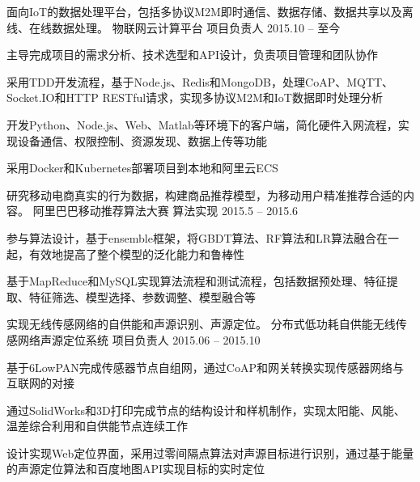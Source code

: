 





\begin{cventries}


\cventry
{面向IoT的数据处理平台，包括多协议M2M即时通信、数据存储、数据共享以及离线、在线数据处理。} %
{物联网云计算平台} %
{项目负责人} %
{2015.10 -- 至今} %
{ %
\begin{cvitems}
\item {主导完成项目的需求分析、技术选型和API设计，负责项目管理和团队协作}
\item {采用TDD开发流程，基于Node.js、Redis和MongoDB，处理CoAP、MQTT、Socket.IO和HTTP RESTful请求，实现多协议M2M和IoT数据即时处理分析}
\item {开发Python、Node.js、Web、Matlab等环境下的客户端，简化硬件入网流程，实现设备通信、权限控制、资源发现、数据上传等功能}
\item{采用Docker和Kubernetes部署项目到本地和阿里云ECS}
\end{cvitems}
}

\cventry
{研究移动电商真实的行为数据，构建商品推荐模型，为移动用户精准推荐合适的内容。} %
{阿里巴巴移动推荐算法大赛} %
{算法实现} %
{2015.5 -- 2015.6} %
{ %
\begin{cvitems}
\item {参与算法设计，基于ensemble框架，将GBDT算法、RF算法和LR算法融合在一起，有效地提高了整个模型的泛化能力和鲁棒性}
\item {基于MapReduce和MySQL实现算法流程和测试流程，包括数据预处理、特征提取、特征筛选、模型选择、参数调整、模型融合等}
\end{cvitems}
}


\cventry
{实现无线传感网络的自供能和声源识别、声源定位。} %
{分布式低功耗自供能无线传感网络声源定位系统} %
{项目负责人} %
{2015.06 -- 2015.10} %
{ %
\begin{cvitems}
\item {基于6LowPAN完成传感器节点自组网，通过CoAP和网关转换实现传感器网络与互联网的对接}
\item {通过SolidWorks和3D打印完成节点的结构设计和样机制作，实现太阳能、风能、温差综合利用和自供能节点连续工作}
\item{设计实现Web定位界面，采用过零间隔点算法对声源目标进行识别，通过基于能量的声源定位算法和百度地图API实现目标的实时定位}
\end{cvitems} 
}


\end{cventries}
